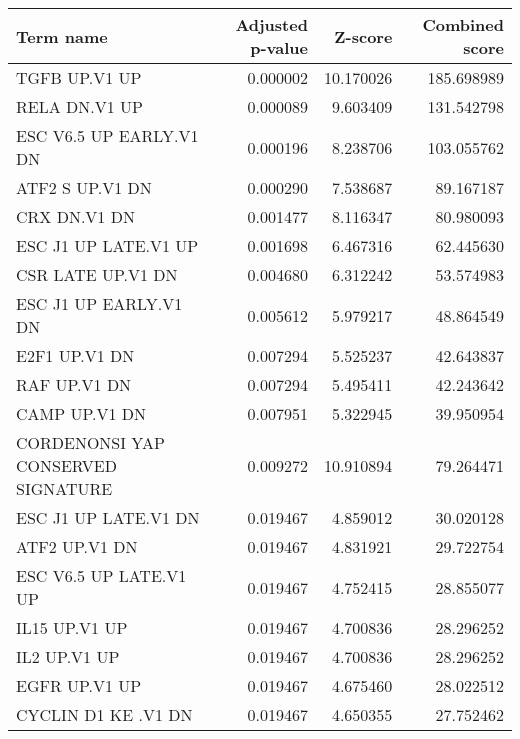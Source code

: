 \begin{tabular}{lrrr}
\toprule
                         Term name &  Adjusted p-value &   Z-score &  Combined score \\
\midrule
                     TGFB UP.V1 UP &          0.000002 & 10.170026 &      185.698989 \\
                     RELA DN.V1 UP &          0.000089 &  9.603409 &      131.542798 \\
           ESC V6.5 UP EARLY.V1 DN &          0.000196 &  8.238706 &      103.055762 \\
                   ATF2 S UP.V1 DN &          0.000290 &  7.538687 &       89.167187 \\
                      CRX DN.V1 DN &          0.001477 &  8.116347 &       80.980093 \\
              ESC J1 UP LATE.V1 UP &          0.001698 &  6.467316 &       62.445630 \\
                 CSR LATE UP.V1 DN &          0.004680 &  6.312242 &       53.574983 \\
             ESC J1 UP EARLY.V1 DN &          0.005612 &  5.979217 &       48.864549 \\
                     E2F1 UP.V1 DN &          0.007294 &  5.525237 &       42.643837 \\
                      RAF UP.V1 DN &          0.007294 &  5.495411 &       42.243642 \\
                     CAMP UP.V1 DN &          0.007951 &  5.322945 &       39.950954 \\
CORDENONSI YAP CONSERVED SIGNATURE &          0.009272 & 10.910894 &       79.264471 \\
              ESC J1 UP LATE.V1 DN &          0.019467 &  4.859012 &       30.020128 \\
                     ATF2 UP.V1 DN &          0.019467 &  4.831921 &       29.722754 \\
            ESC V6.5 UP LATE.V1 UP &          0.019467 &  4.752415 &       28.855077 \\
                     IL15 UP.V1 UP &          0.019467 &  4.700836 &       28.296252 \\
                      IL2 UP.V1 UP &          0.019467 &  4.700836 &       28.296252 \\
                     EGFR UP.V1 UP &          0.019467 &  4.675460 &       28.022512 \\
               CYCLIN D1 KE .V1 DN &          0.019467 &  4.650355 &       27.752462 \\

\end{tabular}
